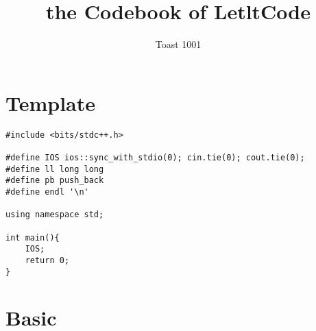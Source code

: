 \documentclass[12pt, a4paper]{article}
\title{the Codebook of LetltCode}
\author{Toast 1001}
\begin{document}
\maketitle
\section{Template}
\begin{lstlisting}
#include <bits/stdc++.h>

#define IOS ios::sync_with_stdio(0); cin.tie(0); cout.tie(0);
#define ll long long
#define pb push_back
#define endl '\n'

using namespace std;

int main(){
    IOS;
    return 0;
}
\end{lstlisting}

\section{Basic}
\end{document}
